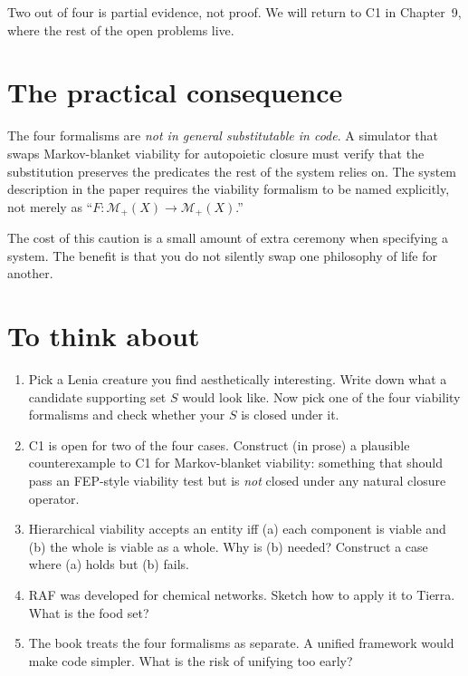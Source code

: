 Two out of four is partial evidence, not proof. We will return to C1
in Chapter~9, where the rest of the open problems live.

\section{The practical consequence}

The four formalisms are \emph{not in general substitutable in code}.
A simulator that swaps Markov-blanket viability for autopoietic
closure must verify that the substitution preserves the predicates
the rest of the system relies on. The system description in the
paper requires the viability formalism to be named explicitly, not
merely as ``$F : \mathcal{M}_+(X) \to \mathcal{M}_+(X)$.''

The cost of this caution is a small amount of extra ceremony when
specifying a system. The benefit is that you do not silently swap
one philosophy of life for another.

\section*{To think about}

\begin{enumerate}
  \item Pick a Lenia creature you find aesthetically interesting.
    Write down what a candidate supporting set $S$ would look like.
    Now pick one of the four viability formalisms and check whether
    your $S$ is closed under it.
  \item C1 is open for two of the four cases. Construct (in prose) a
    plausible counterexample to C1 for Markov-blanket viability:
    something that should pass an FEP-style viability test but is
    \emph{not} closed under any natural closure operator.
  \item Hierarchical viability accepts an entity iff (a) each
    component is viable and (b) the whole is viable as a whole. Why
    is (b) needed? Construct a case where (a) holds but (b) fails.
  \item RAF was developed for chemical networks. Sketch how to apply
    it to Tierra. What is the food set?
  \item The book treats the four formalisms as separate. A unified
    framework would make code simpler. What is the risk of unifying
    too early?
\end{enumerate}
